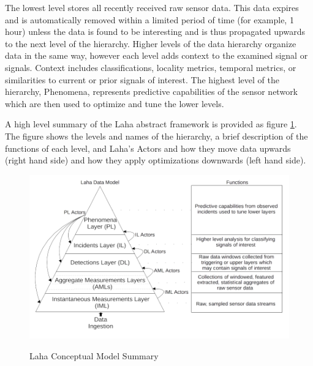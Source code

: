 The lowest level stores all recently received raw sensor data. This data expires and is automatically removed within a limited period of time (for example, 1 hour) unless the data is found to be interesting and is thus propagated upwards to the next level of the hierarchy.  Higher levels of the data hierarchy organize data in the same way, however each level adds context to the examined signal or signals. Context includes classifications, locality metrics, temporal metrics, or similarities to current or prior signals of interest. The highest level of the hierarchy, Phenomena, represents predictive capabilities of the sensor network which are then used to optimize and tune the lower levels.

A high level summary of the Laha abstract framework is provided as figure \ref{laha-abstract-overview}. The figure shows the levels and names of the hierarchy, a brief description of the functions of each level, and Laha's Actors and how they move data upwards (right hand side) and how they apply optimizations downwards (left hand side).

\begin{figure}
	\caption{Laha Conceptual Model Summary}
	\centering
	\includegraphics{figures/laha_abstract_overview.png}
	\label{laha-abstract-overview}
\end{figure}

